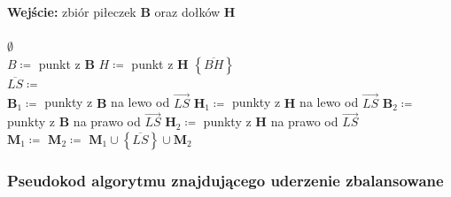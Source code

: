 \documentclass[10pt,a4paper]{article}
\begin{document}
	\begin{algorithmic}
		\State \textbf{Wejście:} zbiór piłeczek $\mathbf{B}$ oraz dołków $\mathbf{H}$  \\
		
		\\
			 
				\State \Return $\emptyset$ 
			\EndIf
			\\
			 
				\State $B \coloneqq $ punkt z $\mathbf{B}$
				\State $H \coloneqq $ punkt z $\mathbf{H}$
				\State \Return $\left\{\overline{BH}\right\}$ 
			\EndIf
			\\
			\State $\overline{LS} \coloneqq$  
			\\
			\State $\mathbf{B}_{1} \coloneqq $ punkty z $\mathbf{B}$ na lewo od $\overrightarrow{LS}$ 
			\State $\mathbf{H}_{1} \coloneqq $ punkty z $\mathbf{H}$ na lewo od $\overrightarrow{LS}$ 
			\State $\mathbf{B}_{2} \coloneqq $ punkty z $\mathbf{B}$ na prawo od $\overrightarrow{LS}$ 
			\State $\mathbf{H}_{2} \coloneqq $ punkty z $\mathbf{H}$ na prawo od $\overrightarrow{LS}$ 
			\\
			\State $\mathbf{M}_{1} \coloneqq $ 
			\State $\mathbf{M}_{2} \coloneqq $  
			\State \Return $\mathbf{M}_{1} \cup \left\{\overline{LS}\right\} \cup \mathbf{M}_{2}$  \\ 
		\EndFunction
	\end{algorithmic}

	\subsubsection{Pseudokod algorytmu znajdującego uderzenie zbalansowane}
	
\end{document}
